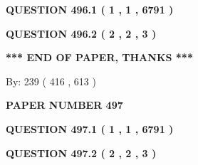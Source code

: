 \documentclass[12pt]{article}
\begin{document}
 
 
 
   
   
  
\vspace{0.2in}
  
{\textbf{\Large{QUESTION
496.1 
 ( 1 , 1 , 6791 )
}}}
  
  
  
\vspace{0.2in}
  
{\textbf{\Large{QUESTION
496.2 
 ( 2 , 2 , 3 )
}}}
  
  
   
   
 \vspace{0.2in}
 
   
   
   
   
\vspace{1.0in} 
{\textbf{\large{ *** END OF PAPER, THANKS *** }}} 
   
   
\hspace{1.0in} By: 
 239 ( 416 ,  613 )
   
   
   
   
\newpage 
\setcounter{page}{ 
   497001 } 
   
   
   
   
 {\textbf{ \Large{ PAPER NUMBER  497  }}}
   
   
\vspace{0.2in}
   
   
   
   
   
   
 \vspace{0.2in}
 
 
 
 
   
   
  
\vspace{0.2in}
  
{\textbf{\Large{QUESTION
497.1 
 ( 1 , 1 , 6791 )
}}}
  
  
  
\vspace{0.2in}
  
{\textbf{\Large{QUESTION
497.2 
 ( 2 , 2 , 3 )
}}}
  
  
   
   
 \vspace{0.2in}
 
   
   
   
   
\end{document}
